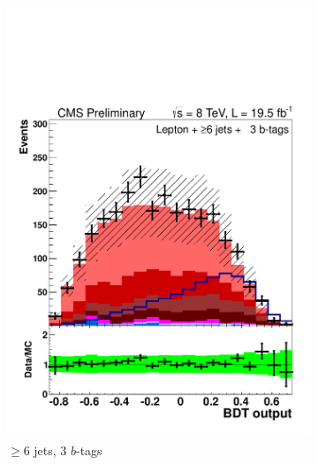 \begin{figure}[hbtp]
\begin{subfigure}[hbtp]{0.31\textwidth}
     \includegraphics[width=\textwidth]{Figures/Analysis_2_Diagrams/LJ_plots_lep/6j3t/lep_disc_final10v16_8TeV_CFMlpANN_BDT_6j3t_cumulative_wRatio_noLegend_lin.pdf}
     \caption{$\ge$6 jets, 3 $b$-tags}\label{lj_BDToutput_8TeV_6}
   \end{subfigure}
   ~ %
   \begin{subfigure}[hbtp]{0.31\textwidth} 

\end{subfigure}
\end{figure}

